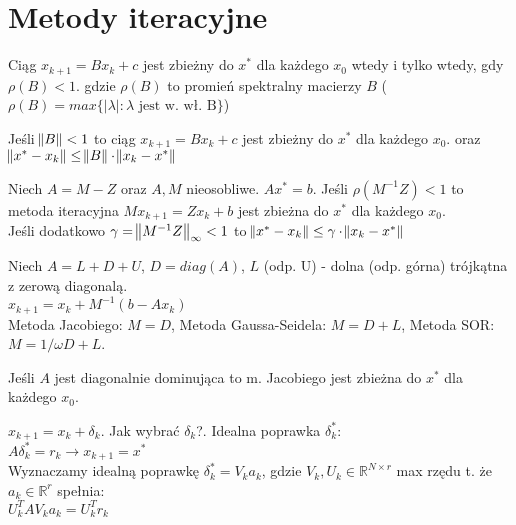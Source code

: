 \section{Metody iteracyjne}

\entry
Ciąg $x_{k+1} = Bx_k + c$ jest zbieżny do $x^*$ dla każdego $x_0$ wtedy i tylko wtedy, gdy $\rho(B) < 1$. gdzie $\rho(B)$ to promień spektralny macierzy $B$ ($\rho(B) = max\{|\lambda| : \lambda \text{ jest w. wł. B}\}$)

\entry
Jeśli $\norm{B} < 1$ to ciąg $x_{k+1} = Bx_k + c$ jest zbieżny do $x^*$ dla każdego $x_0$. oraz $\norm{x^* - x_k} \leq \norm{B} \cdot \norm{x_k - x^*}$

\entry 
Niech $A = M - Z$ oraz $A,M$ nieosobliwe. $Ax^* = b$. Jeśli $\rho(M^{-1}Z) < 1$ to metoda iteracyjna $Mx_{k+1} = Zx_k + b$ jest zbieżna do $x^*$ dla każdego $x_0$.\\
Jeśli dodatkowo $\gamma = \norm{M^{-1}Z}_\infty < 1$ to $\norm{x^* - x_k} \leq \gamma \cdot \norm{x_k - x^*}$

\entry
Niech $A = L + D + U$, $D = diag(A)$, $L$ (odp. U) - dolna (odp. górna) trójkątna z zerową diagonalą.\\
$x_{k+1} = x_k + M^{-1}(b-Ax_k)$\\
Metoda Jacobiego: $M = D$, Metoda Gaussa-Seidela: $M = D + L$, Metoda SOR: $M = 1/\omega D + L$.

\entry
Jeśli $A$ jest diagonalnie dominująca to m. Jacobiego jest zbieżna do $x^*$ dla każdego $x_0$.

\entry 
$x_{k+1} = x_{k} + \delta_k$. Jak wybrać $\delta_k$?. Idealna poprawka $\delta_k^*$:\\
$A\delta_k^* = r_k \rightarrow x_{k+1} = x^*$\\
Wyznaczamy idealną poprawkę $\delta_k^* = V_k a_k$, gdzie $V_k, U_k \in \mathbb{R}^{N \times r}$ max rzędu t. że $a_k \in \mathbb{R}^r$ spełnia:\\
$U_k^TAV_k a_k = U_k^Tr_k$\\